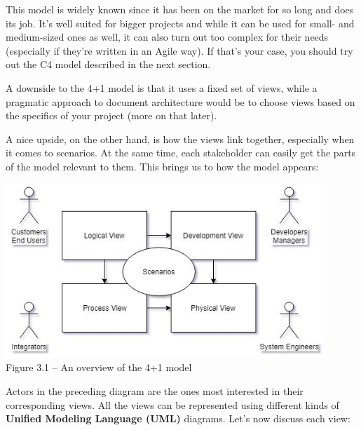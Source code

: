 This model is widely known since it has been on the market for so long and does its job. It's well suited for bigger projects and while it can be used for small- and medium-sized ones as well, it can also turn out too complex for their needs (especially if they're written in an Agile way). If that's your case, you should try out the C4 model described in the next section.

A downside to the 4+1 model is that it uses a fixed set of views, while a pragmatic approach to document architecture would be to choose views based on the specifics of your project (more on that later).

A nice upside, on the other hand, is how the views link together, especially when it comes to scenarios. At the same time, each stakeholder can easily get the parts of the model relevant to them. This brings us to how the model appears: 

\begin{center}
\includegraphics[width=0.9\textwidth]{content/1/chapter3/images/1.jpg}\\
Figure 3.1 – An overview of the 4+1 model
\end{center}

Actors in the preceding diagram are the ones most interested in their corresponding views. All the views can be represented using different kinds of \textbf{Unified Modeling Language (UML)} diagrams. Let's now discuss each view:


